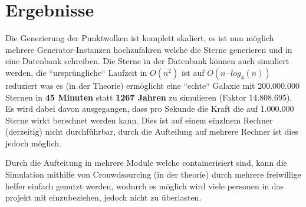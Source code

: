 \section{Ergebnisse}

Die Generierung der Punktwolken ist komplett skaliert, es ist nun möglich
mehrere Generator-Instanzen hochzufahren welche die Sterne generieren und in
eine Datenbank schreiben. Die Sterne in der Datenbank können auch simuliert
werden, die ``ursprüngliche`` Laufzeit in \( O(n^2) \) ist auf \( O(n \cdot
log_4(n)) \) reduziert was es (in der Theorie) ermöglicht eine ``echte``
Galaxie mit 200.000.000 Sternen in \textbf{45 Minuten} statt \textbf{1267
Jahren} zu simulieren (Faktor 14.808.695). Es wird dabei davon ausgegangen,
dass pro Sekunde die Kraft die auf 1.000.000 Sterne wirkt berechnet werden
kann. Dies ist auf einem einzlnem Rechner (derzeitig) nicht durchführbar, durch
die Aufteilung auf mehrere Rechner ist dies jedoch möglich.

\par Durch die Aufteitung in mehrere Module welche containerisiert sind, kann
die Simulation mithilfe von Crouwdsourcing (in der theorie) durch mehrere
freiwillige helfer einfach genutzt werden, wodurch es möglich wird viele
personen in das projekt mit einzubeziehen, jedoch nicht zu überlasten.
